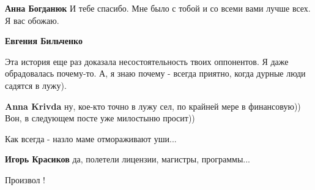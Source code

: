 \begin{itemize}
\begin{itemize}
\textbf{Анна Богданюк} И тебе спасибо. Мне было с тобой и со всеми вами лучше всех. Я вас обожаю.

 
\textbf{Евгения Бильченко} 💛
\end{itemize}

 

Эта история еще раз доказала несостоятельность твоих оппонентов. Я даже
обрадовалась почему-то. А, я знаю почему - всегда приятно, когда дурные люди
садятся в лужу).

\begin{itemize}
 
\textbf{Anna Krivda} ну, кое-кто точно в лужу сел, по крайней мере в финансовую)) Вон, в следующем посте уже милостыню просит))
\end{itemize}

 
Как всегда - назло маме отмораживают уши... 🙁

 
\textbf{Игорь Красиков} да, полетели лицензии, магистры, программы...

 
Произвол !


\end{itemize}
